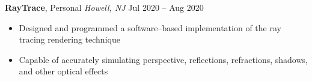 \documentclass[10pt,letterpaper,roman]{moderncv}
\begin{document}
\hfill

\textbf{RayTrace}, Personal \textit{Howell, NJ} \hfill Jul 2020 -- Aug 2020
\begin{itemize}
	\item Designed and programmed a software--based implementation of the ray tracing rendering technique
	\item Capable of accurately simulating perspective, reflections, refractions, shadows, and other optical effects
\end{itemize}
\end{document}
